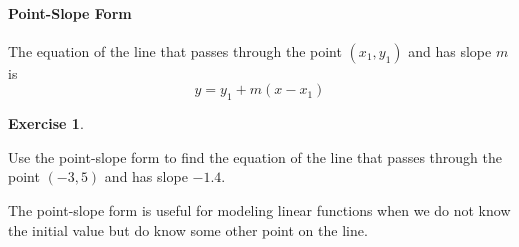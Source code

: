 \documentclass[10pt,]{book}
\theoremstyle{plain}
\theoremstyle{definition}
\theoremstyle{definition}
\theoremstyle{definition}
\theoremstyle{definition}
\theoremstyle{definition}
\newtheorem{exercise}[theorem]{Exercise}
\numberwithin{equation}{section}
\newcounter{figstack}
\newcounter{figindex}
\newlength\fight
\newcommand\pushValignCaptionBottom[5][b]{%
\stepcounter{figstack}%
\expandafter\def\csname %
figalign\romannumeral\value{figstack}\endcsname{#1}%
\expandafter\def\csname %
figtype\romannumeral\value{figstack}\endcsname{#2}%
\expandafter\def\csname %
figwd\romannumeral\value{figstack}\endcsname{#3}%
\expandafter\def\csname %
figcontent\romannumeral\value{figstack}\endcsname{#4}%
\expandafter\def\csname %
figcap\romannumeral\value{figstack}\endcsname{#5}%
\setbox0=\hbox{%
\begin{#2}{#3}#4\end{#2}}%
\ifdim\dimexpr\ht0+\dp0\relax>\fight\global\setlength{\fight}{%
\dimexpr\ht0+\dp0\relax}\fi%
}
\newcommand\popValignCaptionBottom{%
\setcounter{figindex}{0}%
\hfill%
\whiledo{\value{figindex}<\value{figstack}}{%
\stepcounter{figindex}%
\def\tmp{\csname figwd\romannumeral\value{figindex}\endcsname}%
\begin{\csname figtype\romannumeral\value{figindex}\endcsname}[t]{\tmp}%
\centering%
\stackinset{c}{}%
{\csname figalign\romannumeral\value{figindex}\endcsname}{}%
{\csname figcontent\romannumeral\value{figindex}\endcsname}%
{\rule{0pt}{\fight}}\par%
\csname figcap\romannumeral\value{figindex}\endcsname%
\end{\csname figtype\romannumeral\value{figindex}\endcsname}%
\hfill%
}%
\setcounter{figstack}{0}%
\setlength{\fight}{0pt}%
\hfill%
}
\begin{document}
\paragraph[Point-Slope Form]{Point-Slope Form}\label{paragraphs-17}

    The equation of the line that passes through the point \((x_1, y_1)\) and has slope \(m\) is
    \begin{equation*}y= y_1 + m(x− x_1)\end{equation*}
%
\begin{exercise}\label{exercise-point-slope}

    Use the point-slope form to find the equation of the line that passes through the point \((−3, 5)\) and has slope \(−1.4\).
    \leavevmode%
\end{exercise}
\par
The point-slope form is useful for modeling linear functions when we do not know the
initial value but do know some other point on the line.%
\end{document}
